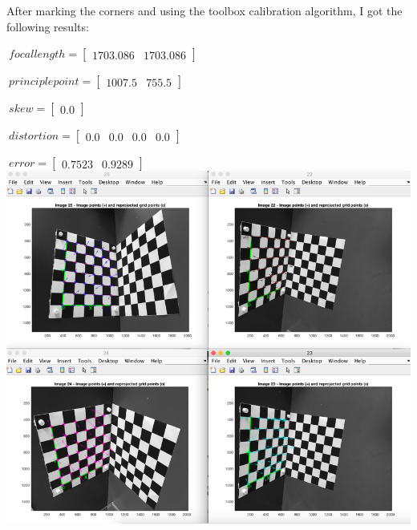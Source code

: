 \documentclass[]{article}
\begin{document}
After marking the corners and using the toolbox calibration algorithm, I got the following results: \newline

$\
focallength =
\begin{bmatrix}
1703.086  & 1703.086
\end{bmatrix}$\newline

$\
principlepoint =
\begin{bmatrix}
1007.5  & 755.5
\end{bmatrix}$\newline

$\
skew =
\begin{bmatrix}
0.0
\end{bmatrix}$\newline

$\
distortion =
\begin{bmatrix}
0.0 & 0.0 & 0.0 & 0.0
\end{bmatrix}$\newline

$\
error =
\begin{bmatrix}
0.7523 & 0.9289
\end{bmatrix}$\newline
\includegraphics{calibrated_images.png}
\end{document}
